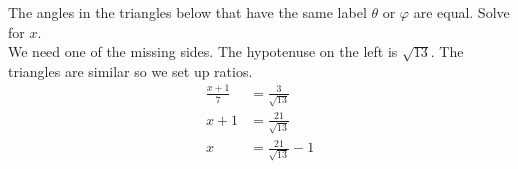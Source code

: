 The angles in the triangles below that have the same label $\theta$ or $\varphi$ are equal. Solve for $x$. \\
\[\]
We need one of the missing sides. The hypotenuse on the left is $\sqrt{13}$.
The triangles are similar so we set up ratios.
$$
\begin{align*}
  \frac{x+1}{7} &= \frac{3}{\sqrt{13}} \\
  x+1 &= \frac{21}{\sqrt{13}} \\
  x &= \frac{21}{\sqrt{13}} - 1
\end{align*}
$$
